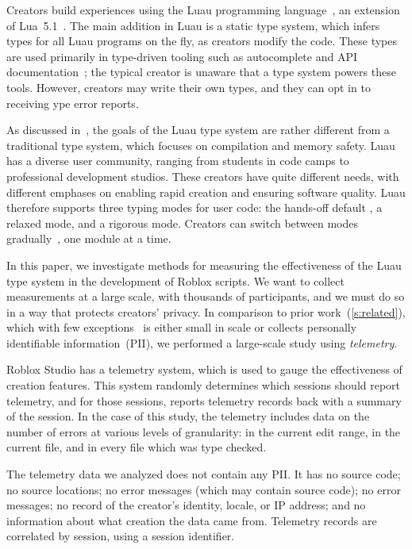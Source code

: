\documentclass[english,submission,cleveref]{programming}
\begin{document}
Creators build experiences using the
{Luau} programming language~\cite{luau-lang.org},
an extension of {Lua~5.1~\cite{lua}}.
The main addition in Luau is a static type system, which infers
types for all Luau programs on the fly, as creators modify the code.
These types are used primarily in type-driven tooling such as autocomplete and
API documentation~\cite{luau-autocomplete}; the typical creator is unaware
that a type system powers these tools.
However, creators may write their own types, and they can opt in
to receiving ype error reports.

As discussed in~\cite{bfj-hatra-2021},
the goals of the {Luau} type system are rather different from
a traditional type system, which focuses on compilation and memory safety.
{Luau} has a diverse user community, ranging from
students in code camps to professional development studios. These
creators have quite different needs, with different emphases on
enabling rapid creation and ensuring software quality.
{Luau} therefore supports three typing modes for user code:
the hands-off default \mnocheck{},
a relaxed \mnonstrict{} mode,
and a rigorous \mstrict{} mode.
Creators can switch between modes
gradually~\cite{st-sfp-2006,tfffgksst-snapl-2017}, one module at a time.


In this paper, we investigate methods for measuring the effectiveness
of the {Luau} type system in the development of {Roblox} scripts.
We want to collect measurements at a large scale, with thousands
of participants, and we must do so in a way that protects creators' privacy.
In comparison to prior work~(\cref{s:related}), which
with few exceptions~\cite{zhlbr-cc-2020,zhlbr-oopsla-2020,hlzbr-ecoop-2021} is either small in scale
or collects personally identifiable information~(PII),
we performed a large-scale study using \panon{} \emph{telemetry}.

{Roblox Studio} has a telemetry system, which is used to gauge
the effectiveness of creation features. This system randomly
determines which sessions should report telemetry, and for those
sessions, reports telemetry records back with a summary of the
session. In the case of this study, the telemetry includes data on the
number of errors at various levels of granularity: in the current edit
range, in the current file, and in every file which was type
checked.

The telemetry data we analyzed does not contain any PII.
It has no source code;
 no source locations;
no error messages (which may contain source code);
no error messages;
no record of the creator's identity, locale, or IP address;
and no information about what creation the data came from.
Telemetry records are correlated by session, using a \panon{}
session identifier.
\end{document}
